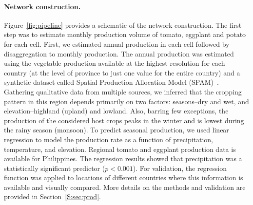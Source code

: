 \documentclass[11pt]{article}
\theoremstyle{definition}
\begin{document}
\paragraph{Network construction.} 
Figure~\ref{fig:pipeline} provides a schematic of the network construction.
The first step was to estimate monthly production volume of tomato,
eggplant and potato for each cell. First, we estimated annual production in
each cell followed by disaggregation to monthly production. The annual
production was estimated using the vegetable production available at the
highest resolution for each country (at the level of province to just one
value for the entire country) and a synthetic dataset called Spatial
Production Allocation Model (SPAM)~\cite{spam}.
Gathering qualitative data from multiple sources, we inferred that the
cropping pattern in this region depends primarily on two factors:
seasons--dry and wet, and elevation--highland (upland) and lowland. Also,
barring few exceptions, the production of the considered host crops peaks
in the winter and is lowest during the rainy season (monsoon).  To predict
seasonal production, we used linear regression to model the production rate
as a function of precipitation, temperature, and elevation. Regional tomato
and eggplant production data is available for Philippines.
The regression results showed that
precipitation was a statistically significant
predictor ($p <0.001$). For validation, the regression function was
applied to locations of different countries where this information is
available and visually compared. More details on the methods and validation are
provided in Section~\ref{S:sec:prod}. 
\end{document}

